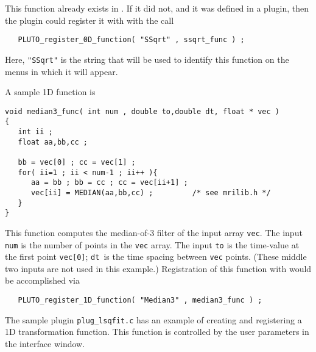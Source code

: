 \vset
This function already exists in \afni.  If it did not, and it
was defined in a plugin, then the plugin could register it with
\afnit with the call
\begin{verbatim}
   PLUTO_register_0D_function( "SSqrt" , ssqrt_func ) ;
\end{verbatim}
Here, {\tt "SSqrt"} is the string that will be used to identify this
function on the menus in which it will appear.

A sample 1D function is
\begin{samepage}\begin{verbatim}
void median3_func( int num , double to,double dt, float * vec )
{
   int ii ;
   float aa,bb,cc ;

   bb = vec[0] ; cc = vec[1] ;
   for( ii=1 ; ii < num-1 ; ii++ ){
      aa = bb ; bb = cc ; cc = vec[ii+1] ;
      vec[ii] = MEDIAN(aa,bb,cc) ;         /* see mrilib.h */
   }
}
\end{verbatim}\end{samepage}
This function computes the median-of-3 filter of the input
array {\tt vec}.  The input {\tt num} is the number of
points in the {\tt vec} array.  The input {\tt to} is
the time-value at the first point {\tt vec[0]};  {\tt dt}~is the time
spacing between {\tt vec} points.  (These middle two inputs
are not used in this example.)  Registration of this function
with \afnit would be accomplished via
\begin{verbatim}
   PLUTO_register_1D_function( "Median3" , median3_func ) ;
\end{verbatim}
The sample plugin {\tt plug\_lsqfit.c} has an example of creating
and registering a 1D transformation function.  This function is
controlled by the user parameters in the interface window.

